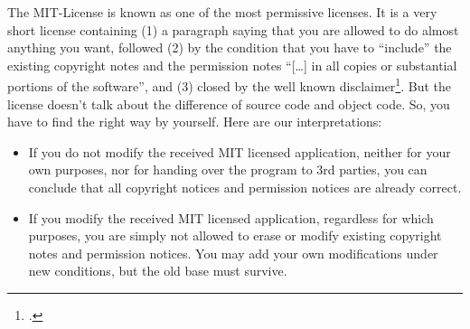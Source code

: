 The MIT-License is known as one of the most permissive licenses. It is a very
short license containing (1) a paragraph saying that you are allowed to do
almost anything you want, followed (2) by the condition that you have to
\enquote{include} the existing copyright notes and the permission notes
\enquote{[\ldots] in all copies or substantial portions of the software}, and
(3) closed by the well known disclaimer\footcite[cf.][\nopage
wp]{MitLicense2012a}. But the license doesn't talk about the difference of
source code and object code. So, you have to find the right way by yourself.
Here are our interpretations:

\begin{itemize}
  \item If you do not modify the received MIT licensed application, neither for
  your own purposes, nor for handing over the program to 3rd parties, you can
  conclude that all copyright notices and permission notices are already correct.
  \item If you modify the received MIT licensed application, regardless for
  which purposes, you are simply not allowed to erase or modify existing
  copyright notes and permission notices. You may add your own modifications
  under new conditions, but the old base must survive.
\end{itemize}

%
